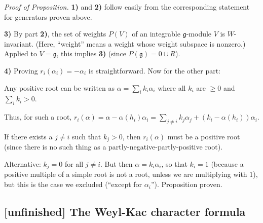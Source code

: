 \documentclass[etingof-lie.tex]{subfiles}
\begin{document}
\textit{Proof of Proposition.} \textbf{1)} and \textbf{2)} follow easily from
the corresponding statement for generators proven above.

\textbf{3)} By part \textbf{2)}, the set of weights $P\left(  V\right)  $ of
an integrable $\mathfrak{g}$-module $V$ is $W$-invariant. (Here, ``weight''
means a weight whose weight subspace is nonzero.) Applied to $V=\mathfrak{g}$,
this implies \textbf{3)} (since $P\left(  \mathfrak{g}\right)  =0\cup R$).

\textbf{4)} Proving $r_{i}\left(  \alpha_{i}\right)  =-\alpha_{i}$ is
straightforward. Now for the other part:

Any positive root can be written as $\alpha=\sum_{i}k_{i}\alpha_{i}$ where all
$k_{i}$ are $\geq0$ and $\sum_{i}k_{i}>0$.

Thus, for such a root, $r_{i}\left(  \alpha\right)  =\alpha-\alpha\left(
h_{i}\right)  \alpha_{i}=\sum_{j\neq i}k_{j}\alpha_{j}+\left(  k_{i}%
-\alpha\left(  h_{i}\right)  \right)  \alpha_{i}$.

If there exists a $j\neq i$ such that $k_{j}>0$, then $r_{i}\left(
\alpha\right)  $ must be a positive root (since there is no such thing as a
partly-negative-partly-positive root).

Alternative: $k_{j}=0$ for all $j\neq i$. But then $\alpha=k_{i}\alpha_{i}$,
so that $k_{i}=1$ (because a positive multiple of a simple root is not a root,
unless we are multiplying with $1$), but this is the case we excluded
(``except for $\alpha_{i}$''). Proposition proven.

\subsection{\textbf{[unfinished]} The Weyl-Kac character formula}
\end{document}
